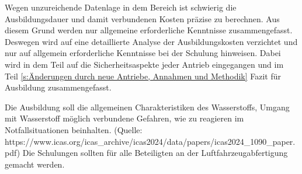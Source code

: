 Wegen unzureichende Datenlage in dem Bereich ist schwierig die Ausbildungsdauer und damit verbundenen Kosten präzise zu berechnen.
Aus diesem Grund werden nur allgemeine erforderliche Kenntnisse zusammengefasst.
Deswegen wird auf eine detaillierte Analyse der Ausbildungskosten verzichtet und nur auf allgemein erforderliche Kenntnisse bei
der Schulung hinweisen. Dabei wird in dem Teil auf die Sicherheitsaspekte jeder Antrieb eingegangen und im Teil 
\ref{s:Änderungen durch neue Antriebe, Annahmen und Methodik} Fazit für Ausbildung zusammengefasst.


Die Ausbildung soll die allgemeinen Charakteristiken des Wasserstoffs, Umgang mit Wasserstoff möglich verbundene Gefahren, wie zu reagieren im Notfallsituationen
beinhalten. (Quelle: https://www.icas.org/icas_archive/icas2024/data/papers/icas2024_1090_paper.pdf)
Die Schulungen sollten für alle Beteiligten an der Luftfahrzeugabfertigung gemacht werden.
